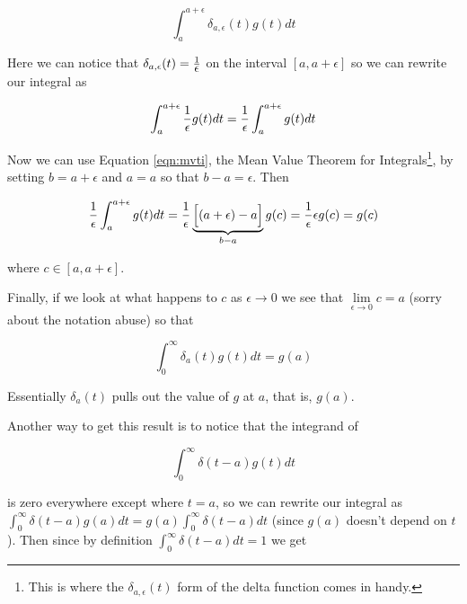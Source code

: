 \documentclass{article}
\theoremstyle{definition}
\begin{document}
\begin{equation*}
  \int_{a}^{a + \epsilon} \delta_{a,\epsilon}(t) g(t) dt
\end{equation*}

\bigskip
\noindent
Here we can notice that $ \delta_{a,\epsilon}(t) = \frac{1}{\mathlarger{\epsilon}}$ on the interval $[a, a+\epsilon]$ so we can rewrite our integral as 

\bigskip
\begin{equation*}
  \int_{a}^{a + \epsilon} \frac{1}{\mathlarger{\epsilon}} g(t) dt =  \frac{1}{\mathlarger{\epsilon}} \int_{a}^{a + \epsilon} g(t) dt
\end{equation*}

\bigskip
\noindent
Now we can use Equation \ref{eqn:mvti}, the Mean Value Theorem for Integrals\footnote{This is where the $\delta_{a,\epsilon}(t)$ form of the delta function comes in handy.},
by setting $b = a + \epsilon$ and $a = a$ so that $b - a = \epsilon$. Then 

\bigskip
\begin{equation*}
 \frac{1}{\mathlarger{\epsilon}} \int_{a}^{a + \epsilon} g(t) dt =  \frac{1}{\mathlarger{\epsilon}} \underbrace{ \Big [(a + \epsilon) - a \Big]}_{b -a} g(c) = \frac{1}{\mathlarger{\epsilon}} \epsilon g(c) = g(c)
\end{equation*}

\bigskip
\noindent
where $c \in [a, a + \epsilon]$. 

\bigskip
\noindent
Finally, if we look at what happens to $c$ as $\epsilon \to 0$ we see that $\lim\limits_{\epsilon \to 0} c = a$ (sorry about the notation abuse)
so that 

\begin{equation}
  \int_{0}^{\infty} \delta_{a}(t) g(t) dt = g(a)
  \label{eqn:g(a)}
\end{equation}

\bigskip
\noindent
Essentially $\delta_{a}(t)$ pulls out the value of $g$ at $a$, that is, $g(a)$.

\bigskip
\noindent
Another way to get this result \cite{youtube:suskind2008.4} is to notice that the integrand of 

\bigskip
\begin{equation*}
  \int_{0}^{\infty} \delta (t-a) g(t) dt
\end{equation*}

\bigskip
\noindent
is zero everywhere except where $t = a$, so we can rewrite our integral as
 $\int_{0}^{\infty} \delta (t-a) g(a) dt = g(a) \int_{0}^{\infty} \delta (t-a) dt$ (since $g(a)$ doesn't depend on $t$). 
 Then since by definition $ \int_{0}^{\infty} \delta (t-a) dt = 1$ we get
\end{document}
